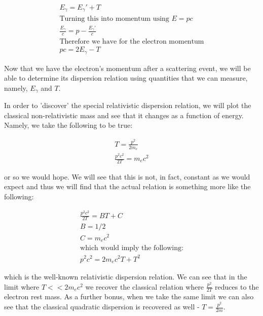\documentclass[reprint, nobibnotes, amssymb, amsmath, amsfonts, physics, mathtools, mathrsfs, floatfix]{revtex4-1}
\begin{document}
    \begin{gather}
      E_\gamma = E_\gamma ' + T \\
      \text{Turning this into momentum using $E = pc$}\nonumber\\
      \frac{E_\gamma}{c} = p - \frac{E_\gamma '}{c} \\
      \text{Therefore we have for the electron momentum}\nonumber\\
      pc = 2E_\gamma - T
    \end{gather}

    Now that we have the electron's momentum after a scattering event, we will be able to determine its dispersion relation using quantities that we can measure, namely, $E_\gamma$ and $T$.

    \hspace{.25cm}

    In order to 'discover' the special relativistic dispersion relation, we will plot the classical non-relativistic mass and see that it changes as a function of energy.  Namely, we take the following to be true:

    \begin{gather}
      T = \frac{p^2}{2m_e} \\
      \frac{p^2c^2}{2T} = m_ec^2 \label{eq:rel_mass}
    \end{gather}

    or so we would hope.  We will see that this is not, in fact, constant as we would expect and thus we will find that the actual relation is something more like the following:

    \begin{gather}
      \frac{p^2c^2}{2T} = BT + C \label{eq:fitfn} \\
      B = 1/2 \\
      C = m_ec^2 \\
      \text{which would imply the following:}\nonumber \\
      p^2c^2 = 2m_ec^2 T + T^2 \label{eq:rel_dispersion}
    \end{gather}

    which is the well-known relativistic dispersion relation.  We can see that in the limit where $T << 2m_ec^2$ we recover the classical relation where $\frac{p^2}{2T}$ reduces to the electron rest mass.  As a further bonus, when we take the same limit we can also see that the classical quadratic dispersion is recovered as well - $T = \frac{p^2}{2m}$.

    \hspace{.25cm}
\end{document}
